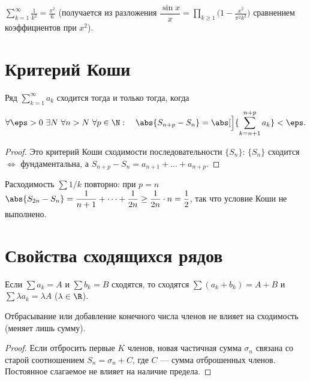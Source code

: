 \begin{remark}
$\displaystyle\sum_{k=1}^\infty\frac1{k^2}=\frac{\pi^2}{6}$ (получается из разложения
$\dfrac{\sin x}{x}=\prod_{k\ge1}\bigl(1-\tfrac{x^2}{\pi^2k^2}\bigr)$ сравнением коэффициентов при
$x^2$).
\end{remark}

\section{Критерий Коши}

\begin{criterion}[Коши]
Ряд $\displaystyle\sum_{k=1}^\infty a_k$ сходится тогда и только тогда, когда
\[
  \forall\eps>0\ \exists N\ \forall n>N\ \forall p\in\N:\quad
  \abs{S_{n+p}-S_n}=\abs[\Big]{\sum_{k=n+1}^{n+p}a_k}<\eps .
\]
\end{criterion}

\begin{proof}
Это критерий Коши сходимости последовательности $\{S_n\}$: $\{S_n\}$ сходится $\iff$ фундаментальна,
а $S_{n+p}-S_n=a_{n+1}+\dots+a_{n+p}$.
\end{proof}

\begin{example}
Расходимость $\sum1/k$ повторно: при $p=n$
$\displaystyle\abs{S_{2n}-S_n}=\frac1{n+1}+\dots+\frac1{2n}\ge\frac1{2n}\cdot n=\frac12$, так что
условие Коши не выполнено.
\end{example}

\section{Свойства сходящихся рядов}

\begin{property}[линейность]
Если $\sum a_k=A$ и $\sum b_k=B$ сходятся, то сходятся $\sum(a_k+b_k)=A+B$ и
$\sum\lambda a_k=\lambda A$ ($\lambda\in\R$).
\end{property}

\begin{property}
Отбрасывание или добавление конечного числа членов не влияет на сходимость (меняет лишь сумму).
\end{property}

\begin{proof}
Если отбросить первые $K$ членов, новая частичная сумма $\sigma_n$ связана со старой соотношением
$S_n=\sigma_n+C$, где $C$ — сумма отброшенных членов. Постоянное слагаемое не влияет на наличие
предела.
\end{proof}

